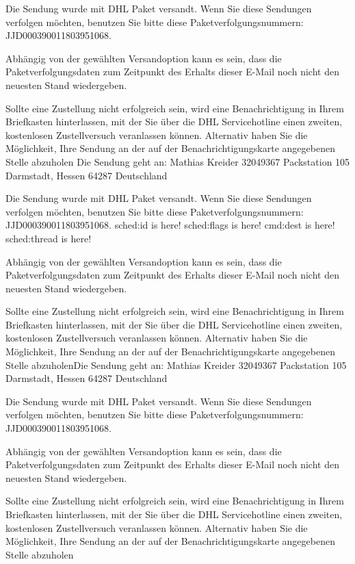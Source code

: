 \documentclass{report}
\begin{document}
Die Sendung wurde mit DHL Paket versandt. Wenn Sie diese Sendungen verfolgen möchten, benutzen Sie bitte diese Paketverfolgungsnummern: JJD000390011803951068.


Abhängig von der gewählten Versandoption kann es sein, dass die Paketverfolgungsdaten zum Zeitpunkt des Erhalts dieser E-Mail noch nicht den neuesten Stand wiedergeben.

Sollte eine Zustellung nicht erfolgreich sein, wird eine Benachrichtigung in Ihrem Briefkasten hinterlassen, mit der Sie über die DHL Servicehotline einen zweiten, kostenlosen Zustellversuch veranlassen können. Alternativ haben Sie die Möglichkeit, Ihre Sendung an der auf der Benachrichtigungskarte angegebenen Stelle abzuholen
Die Sendung geht an:   Mathias Kreider
   32049367
   Packstation 105
   Darmstadt, 
   Hessen 
   64287
   Deutschland

Die Sendung wurde mit DHL Paket versandt. Wenn Sie diese Sendungen verfolgen möchten, benutzen Sie bitte diese Paketverfolgungsnummern: JJD000390011803951068.
   \gls{sched:id} is here!
   \gls{sched:flags} is here!
   \gls{cmd:dest} is here!
   \gls{sched:thread} is here!

Abhängig von der gewählten Versandoption kann es sein, dass die Paketverfolgungsdaten zum Zeitpunkt des Erhalts dieser E-Mail noch nicht den neuesten Stand wiedergeben.

Sollte eine Zustellung nicht erfolgreich sein, wird eine Benachrichtigung in Ihrem Briefkasten hinterlassen, mit der Sie über die DHL Servicehotline einen zweiten, kostenlosen Zustellversuch veranlassen können. Alternativ haben Sie die Möglichkeit, Ihre Sendung an der auf der Benachrichtigungskarte angegebenen Stelle abzuholenDie Sendung geht an:   Mathias Kreider
   32049367
   Packstation 105
   Darmstadt, 
   Hessen 
   64287
   Deutschland

Die Sendung wurde mit DHL Paket versandt. Wenn Sie diese Sendungen verfolgen möchten, benutzen Sie bitte diese Paketverfolgungsnummern: JJD000390011803951068.


Abhängig von der gewählten Versandoption kann es sein, dass die Paketverfolgungsdaten zum Zeitpunkt des Erhalts dieser E-Mail noch nicht den neuesten Stand wiedergeben.

Sollte eine Zustellung nicht erfolgreich sein, wird eine Benachrichtigung in Ihrem Briefkasten hinterlassen, mit der Sie über die DHL Servicehotline einen zweiten, kostenlosen Zustellversuch veranlassen können. Alternativ haben Sie die Möglichkeit, Ihre Sendung an der auf der Benachrichtigungskarte angegebenen Stelle abzuholen
\end{document}

